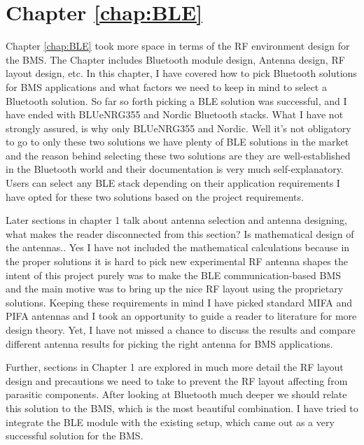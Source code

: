\section{Chapter \ref{chap:BLE}}
Chapter \ref{chap:BLE} took more space in terms of the RF environment design for the BMS. The Chapter includes Bluetooth module design, Antenna design, RF layout design, etc. In this chapter, I have covered how to pick Bluetooth solutions for BMS applications and what factors we need to keep in mind to select a Bluetooth solution. So far so forth picking a BLE solution was successful, and I have ended with BLUeNRG355 and Nordic Bluetooth stacks. What I have not strongly assured, is why only BLUeNRG355 and Nordic. Well it's not obligatory to go to only these two solutions we have plenty of BLE solutions in the market and the reason behind selecting these two solutions are they are well-established in the Bluetooth world and their documentation is very much self-explanatory.
Users can select any BLE stack depending on their application requirements I have opted for these two solutions based on the project requirements.

Later sections in chapter 1 talk about antenna selection and antenna designing, what makes the reader disconnected from this section? Is mathematical design of the antennas.. Yes I have not included the mathematical calculations because in the proper solutions it is hard to pick new experimental RF antenna shapes the intent of this project purely was to make the BLE communication-based BMS and the main motive was to bring up the nice RF layout using the proprietary solutions. Keeping these requirements in mind I have picked standard MIFA and PIFA antennas and I took an opportunity to guide a reader to literature for more design theory. Yet, I have not missed a chance to discuss the results and compare different antenna results for picking the right antenna for BMS applications.

Further, sections in Chapter 1 are explored in much more detail the RF layout design and precautions we need to take to prevent the RF layout affecting from parasitic components.
After looking at Bluetooth much deeper we should relate this solution to the BMS, which is the most beautiful combination. I have tried to integrate the BLE module with the existing setup, which came out as a very successful solution for the BMS.

